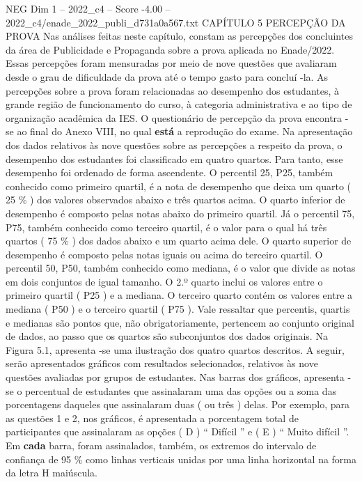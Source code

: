 \begin{textsample}{NEG Dim 1 – 2022\_c4 – Score -4.00 – 2022\_c4/enade\_2022\_publi\_d731a0a567.txt}  \label{ex:f1_neg_175}
CAPÍTULO 5 PERCEPÇÃO DA PROVA Nas análises feitas neste capítulo, constam as percepções dos concluintes da área de Publicidade e Propaganda sobre a prova aplicada no Enade/2022.
Essas percepções foram mensuradas por meio de nove questões que avaliaram desde o grau de dificuldade da prova até o tempo gasto para concluí -la.
As percepções sobre a prova foram relacionadas ao desempenho dos estudantes, à grande região de funcionamento do curso, à categoria administrativa e ao tipo de organização acadêmica da IES.
O questionário de percepção da prova encontra -se ao final do Anexo VIII, no qual \textbf{está} a reprodução do exame.
Na apresentação dos dados relativos às nove questões sobre as percepções a respeito da prova, o desempenho dos estudantes foi classificado em quatro quartos.
Para tanto, esse desempenho foi ordenado de forma ascendente.
O percentil 25, P25, também conhecido como primeiro quartil, é a nota de desempenho que deixa um quarto ( 25 \% ) dos valores observados abaixo e três quartos acima.
O quarto inferior de desempenho é composto pelas notas abaixo do primeiro quartil.
Já o percentil 75, P75, também conhecido como terceiro quartil, é o valor para o qual há três quartos ( 75 \% ) dos dados abaixo e um quarto acima dele.
O quarto superior de desempenho é composto pelas notas iguais ou acima do terceiro quartil.
O percentil 50, P50, também conhecido como mediana, é o valor que divide as notas em dois conjuntos de igual tamanho.
O 2.º quarto inclui os valores entre o primeiro quartil ( P25 ) e a mediana.
O terceiro quarto contém os valores entre a mediana ( P50 ) e o terceiro quartil ( P75 ).
Vale ressaltar que percentis, quartis e medianas são pontos que, não obrigatoriamente, pertencem ao conjunto original de dados, ao passo que os quartos são subconjuntos dos dados originais.
Na Figura 5.1, apresenta -se uma ilustração dos quatro quartos descritos.
A seguir, serão apresentados gráficos com resultados selecionados, relativos às nove questões avaliadas por grupos de estudantes.
Nas barras dos gráficos, apresenta -se o percentual de estudantes que assinalaram uma das opções ou a soma das porcentagens daqueles que assinalaram duas ( ou três ) delas.
Por exemplo, para as questões 1 e 2, nos gráficos, é apresentada a porcentagem total de participantes que assinalaram as opções ( D ) “ Difícil ” e ( E ) “ Muito difícil ”.
Em \textbf{cada} barra, foram assinalados, também, os extremos do intervalo de confiança de 95 \% como linhas verticais unidas por uma linha horizontal na forma da letra H maiúscula.

\end{textsample}
